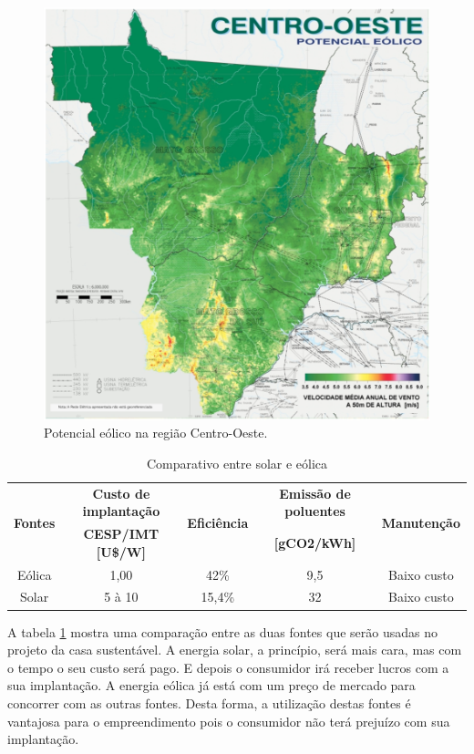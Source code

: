 \begin{figure}[H]
\centering
\includegraphics[width=.65\linewidth,keepaspectratio,angle=0]{figuras/potencial_centro_oeste.eps}
\caption{Potencial eólico na região Centro-Oeste.}
\label{potencial_centro_oeste}
\end{figure}


\begin{table}[H]
\centering
\begin{tabular}{|c|c|c|c|c|}
\hline 
\multirow{2}{*}{\textbf{Fontes}} & \textbf{Custo de implantação} & \multirow{2}{*}{\textbf{Eficiência}} & \textbf{Emissão de poluentes} & \multirow{2}{*}{\textbf{Manutenção}}\tabularnewline
 & \textbf{CESP/IMT {[}U\$/W{]}} &  & \textbf{{[}gCO2/kWh{]}} & \tabularnewline
\hline 
\hline 
Eólica & 1,00 & 42\% & 9,5 & Baixo custo\tabularnewline
\hline 
Solar & 5 à 10 & 15,4\% & 32 & Baixo custo\tabularnewline
\hline 
\end{tabular}
\caption{Comparativo entre solar e eólica}
\label{comparativo_solar_eolica}
\end{table}

A tabela \ref{comparativo_solar_eolica} mostra uma comparação entre as duas fontes que serão usadas no projeto da casa sustentável. A energia solar, a princípio, será mais cara, mas com o tempo o seu custo será pago. E depois o consumidor irá receber lucros com a sua implantação. A energia eólica já está com um preço de mercado para concorrer com as outras fontes. Desta forma, a utilização destas fontes é vantajosa para o empreendimento pois o consumidor não terá prejuízo com sua implantação.





































